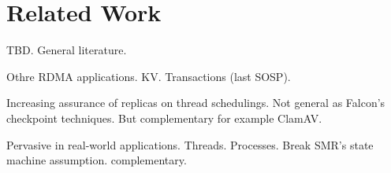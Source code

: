 \section{Related Work} \label{sec:related}


 TBD. General literature.





 Othre RDMA applications. KV. Transactions 
(last SOSP).

 Increasing assurance of replicas on thread schedulings. Not general 
as Falcon's checkpoint techniques. But complementary for example ClamAV.

 Pervasive in real-world applications. Threads. Processes. 
Break SMR's state machine assumption. complementary.



